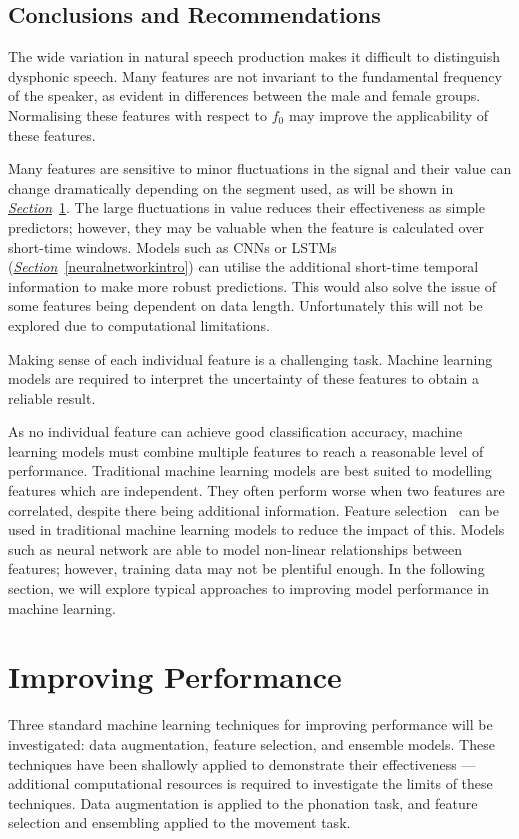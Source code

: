 \documentclass[12pt, twoside]{book}
\begin{document}
\subsection{Conclusions and Recommendations}
\label{visfeatrecommendations}
The wide variation in natural speech production makes it difficult to distinguish dysphonic speech. Many features are not invariant to the fundamental frequency of the speaker, as evident in differences between the male and female groups. Normalising these features with respect to $f_0$ may improve the applicability of these features.

Many features are sensitive to minor fluctuations in the signal and their value can change dramatically depending on the segment used, as will be shown in \textit{\hyperref[dataaugment]{Section}}~\ref{dataaugment}. The large fluctuations in value reduces their effectiveness as simple predictors; however, they may be valuable when the feature is calculated over short-time windows. Models such as CNNs or LSTMs (\textit{\hyperref[neuralnetworkintro]{Section}}~\ref{neuralnetworkintro}) can utilise the additional short-time temporal information to make more robust predictions. This would also solve the issue of some features being dependent on data length. Unfortunately this will not be explored due to computational limitations.

\begin{highlight}
	Making sense of each individual feature is a challenging task. Machine learning models are required to interpret the uncertainty of these features to obtain a reliable result.
\end{highlight}

As no individual feature can achieve good classification accuracy, machine learning models must combine multiple features to reach a reasonable level of performance. Traditional machine learning models are best suited to modelling features which are independent. They often perform worse when two features are correlated, despite there being additional information. Feature selection~\cite{skfeature} can be used in traditional machine learning models to reduce the impact of this. Models such as neural network are able to model non-linear relationships between features; however, training data may not be plentiful enough. In the following section, we will explore typical approaches to improving model performance in machine learning.
\newpage
\section{Improving Performance}
\label{dataaugment}
Three standard machine learning techniques for improving performance will be investigated: data augmentation, feature selection, and ensemble models.  These techniques have been shallowly applied to demonstrate their effectiveness --- additional computational resources is required to investigate the limits of these techniques. Data augmentation is applied to the phonation task, and feature selection and ensembling applied to the movement task.
\end{document}
